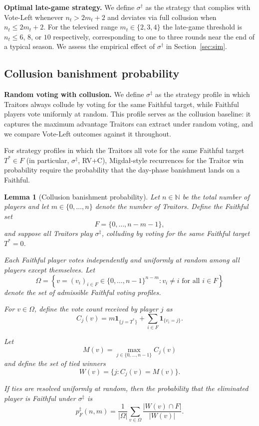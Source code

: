 \documentclass[11pt,a4paper]{article}
\newtheorem{lemma}{Lemma}
\begin{document}
\textbf{Optimal late-game strategy.} We define \(\sigma^\dagger\) as the
strategy that complies with Vote-Left whenever \(n_t > 2m_t + 2\) and
deviates via full collusion when \(n_t \leq 2m_t + 2\). For
the televised range \(m_t \in \{2, 3, 4\}\) the late-game threshold is
\(n_t \leq 6\), \(8\), or \(10\) respectively, corresponding to one to
three rounds near the end of a typical season. We assess the empirical
effect of \(\sigma^\dagger\) in Section~\ref{sec:sim}.

\subsection{Collusion banishment probability}
\label{sec:collusion-banishment}

\textbf{Random voting with collusion.} We define \(\sigma^\ddagger\) as the
strategy profile in which Traitors always collude by voting for the same
Faithful target, while Faithful players vote uniformly at random. This profile
serves as the collusion baseline: it captures the maximum advantage Traitors
can extract under random voting, and we compare Vote-Left outcomes against it
throughout.

For strategy profiles in which the Traitors all vote for the same Faithful
target \(T^* \in F\) (in particular, \(\sigma^\ddagger\), RV+C),
Migda\l{}-style recurrences for the Traitor win probability require the
probability that the day-phase banishment lands on a Faithful.

\begin{lemma}[Collusion banishment probability]\label{lemma:collusion}
Let \(n \in \mathbb{N}\) be the total number of players and let
\(m \in \{0,\dots,n\}\) denote the number of Traitors. Define the
Faithful set
\[
F=\{0,\dots,n-m-1\},
\]
and suppose all Traitors play \(\sigma^\ddagger\), colluding by voting
for the same Faithful target \(T^\ast = 0\).

Each Faithful player votes independently and uniformly at random among
all players except themselves. Let
\[
\Omega
=
\left\{
v=(v_i)_{i\in F}\in \{0,\dots,n-1\}^{n-m}
:
v_i\neq i
\text{ for all } i\in F
\right\}
\]
denote the set of admissible Faithful voting profiles.

For \(v\in\Omega\), define the vote count received by player \(j\) as
\[
C_j(v)
=
m\mathbf 1_{\{j=T^\ast\}}
+
\sum_{i\in F}\mathbf 1_{\{v_i=j\}}.
\]

Let
\[
M(v)=\max_{j\in\{0,\dots,n-1\}} C_j(v)
\]
and define the set of tied winners
\[
W(v)=\{j : C_j(v)=M(v)\}.
\]

If ties are resolved uniformly at random, then the probability that the
eliminated player is Faithful under \(\sigma^\ddagger\) is
\begin{equation}\label{eq:coll_banish}
p_F^{\ddagger}(n,m)
=
\frac1{|\Omega|}
\sum_{v\in\Omega}
\frac{|W(v)\cap F|}{|W(v)|}.
\end{equation}
\end{lemma}
\end{document}
